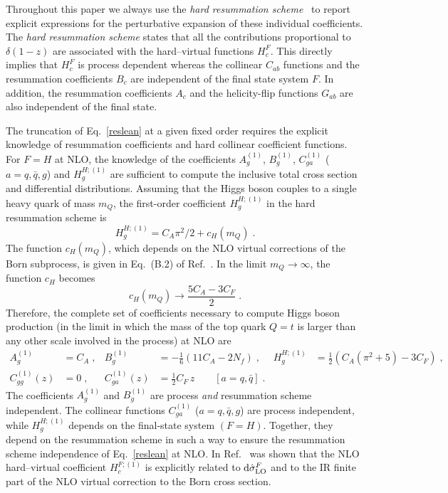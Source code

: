 \documentclass[12pt]{article}
\DeclareRobustCommand{\nn}{\nonumber}
\DeclareRobustCommand{\rd}{\ensuremath{\mathrm{d}}}
\begin{document}
\begin{appendix}
Throughout this paper we always use the \textit{hard resummation scheme}~\cite{Catani:2013tia} to report explicit expressions for the perturbative expansion of these individual coefficients. The \textit{hard resummation scheme} states that all the contributions proportional to $\delta(1-z)$ are associated with the hard--virtual functions $H_c^{F}$. This directly implies that $H_c^{F}$ is process dependent whereas the collinear $C_{ab}$ functions and the resummation coefficients $B_{c}$ are independent of the final state system $F$. In addition, the resummation coefficients $A_{c}$ and the helicity-flip functions $G_{ab}$ are also independent of the final state.

The truncation of Eq.~\eqref{reslean} at a given fixed order requires the explicit knowledge of resummation coefficients and hard collinear coefficient functions.
For $F=H$ at NLO, the knowledge of the coefficients $A^{(1)}_{g}$, $B^{(1)}_{g}$, $C^{(1)}_{ga}$ ($a=q,{\bar q},g$) and $H^{H;(1)}_{g}$ are sufficient to compute the inclusive total cross section and differential distributions. Assuming that the Higgs boson couples to a single heavy quark of mass $m_Q$, the first-order coefficient $H_g^{H;(1)}$ in the hard resummation scheme is~\cite{Catani:2013tia}
\begin{equation}
  H_g^{H;(1)} = C_A\pi^2/2+c_H(m_Q) \;.
  \label{H1g}
\end{equation}
The function $c_H(m_Q)$, which depends on the NLO virtual corrections of the Born subprocess, is given in Eq.~(B.2) of Ref.~\cite{Spira:1995rr}. In the limit $m_Q\to \infty$, the function $c_H$ becomes
\begin{equation}
  c_H(m_Q)\longrightarrow\frac{5C_A-3C_F}{2} \;.
\end{equation}
Therefore, the complete set of coefficients necessary to compute Higgs boson production (in the limit in which the mass of the top quark $Q=t$ is larger than any other scale involved in the process) at NLO are
\begin{align}
  A^{(1)}_{g} &= C_{A}\;, &
  B^{(1)}_{g} &= -\frac{1}{6} \left( 11 C_A - 2 N_f \right)\;, &
  H^{H;(1)}_{g} &= \frac{1}{2}(C_{A}(\pi^{2}+5)-3 C_{F})\;,
  \nn\\
  C^{(1)}_{gg}(z) &= 0 \;, &
  C^{(1)}_{ga}(z) &= \frac{1}{2}C_F\,z \qquad\left[a=q,{\bar q}\right] \;.
  \label{eq:nloconstants}
\end{align}
The coefficients $A^{(1)}_{g}$ and $B^{(1)}_{g}$ are process \emph{and} resummation scheme independent. The collinear functions $C^{(1)}_{ga}$ ($a=q,{\bar q},g$) are process independent, while $H^{H;(1)}_{g}$ depends on the final-state system $(F=H)$. Together,  they depend on the resummation scheme in such a way to ensure the resummation scheme independence of Eq.~\eqref{reslean} at NLO. In Ref.~\cite{deFlorian:2001zd} was shown that the NLO hard--virtual coefficient $H^{F;(1)}_{c}$ is explicitly related to $\rd\hat{\sigma}^{F}_{\rm LO}$ and to the IR finite part of the NLO virtual correction to the Born cross section. 


\end{appendix}
\end{document}
